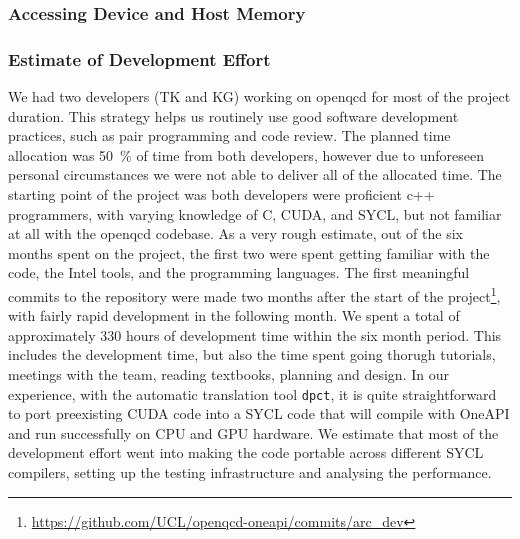 \documentclass[../main]{subfiles}
\begin{document}

\subsubsection{Accessing Device and Host Memory}\label{sec:openqcd_memoryaccess}


\subsubsection{Estimate of Development Effort}\label{sec:openqcd_personhours}

We had two developers (TK and KG) working on openqcd for most of the project duration.
This strategy helps us routinely use good software development practices, such as pair programming and code review.
The planned time allocation was 50~\% of time from both developers, however due to unforeseen personal circumstances we were not able to deliver all of the allocated time.
The starting point of the project was both developers were proficient c++ programmers, with varying knowledge of C, CUDA, and SYCL, but not familiar at all with the openqcd codebase.
As a very rough estimate, out of the six months spent on the project, the first two were spent getting familiar with the code, the Intel tools, and the programming languages.
The first meaningful commits to the repository were made two months after the start of the project\footnote{\url{https://github.com/UCL/openqcd-oneapi/commits/arc_dev}}, with fairly rapid development in the following month.
We spent a total of approximately 330 hours of development time within the six month period. This includes the development time, but also the time spent going thorugh tutorials, meetings with the team, reading textbooks, planning and design.
In our experience, with the automatic translation tool \texttt{dpct}, it is quite straightforward to port preexisting CUDA code into a SYCL code that will compile with OneAPI and run successfully on CPU and GPU hardware.
We estimate that most of the development effort went into making the code portable across different SYCL compilers, setting up the testing infrastructure and analysing the performance.
\end{document}
